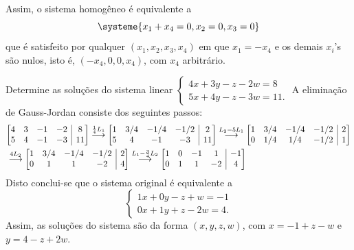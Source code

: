 \documentclass[12pt,a4paper]{article}
\makeatletter
\newenvironment{amatrix}[1]{%
  \left[\begin{array}{@{}*{#1}{c}|c@{}}
}{%
  \end{array}\right]
}
\newcommand{\grstep}[2][\relax]{%
   \ensuremath{\mathrel{
       {\mathop{\longrightarrow}\limits^{#2\mathstrut}_{
                                     \begin{subarray}{l} #1 \end{subarray}}}}}}
\makeatother
\begin{document}
\begin{ExerciseList}
\begin{enumerate}
Assim, o sistema homogêneo é equivalente a
\[
\systeme{
x_1 + x_4 = 0,
x_2 = 0,
x_3 = 0
}
\]
que é satisfeito por qualquer $(x_1, x_2, x_3, x_4)$ em que $x_1 = -x_4$ e os demais $x_i$'s são nulos, isto é, $(-x_4, 0, 0, x_4)$, com $x_4$ arbitrário.
\end{enumerate}

\Exercise[title={1,8}] Determine as soluções do sistema linear $\begin{cases}
4x + 3y - z -2 w = 8\\
5x + 4y - z -3 w = 11.
\end{cases}
$
\Answer A eliminação de Gauss-Jordan consiste dos seguintes passos:
\begin{align*}
& \begin{amatrix}{4}
4 & 3 & -1 & -2 &  8\\
5 & 4 & -1 & -3 & 11\\
\end{amatrix}
\grstep{ \frac{1}{4}L_1 }
\begin{amatrix}{4}
1 & 3/4 & -1/4 & -1/2 &  2\\
5 & 4 & -1 & -3 & 11\\
\end{amatrix}
\grstep{ L_2 -5 L_1 }
\begin{amatrix}{4}
1 & 3/4 & -1/4 & -1/2 &  2\\
0 & 1/4 & 1/4 & -1/2 & 1\\
\end{amatrix}\\
&\grstep{ 4L_2 }
\begin{amatrix}{4}
1 & 3/4 & -1/4 & -1/2 &  2\\
0 & 1 & 1 & -2 & 4\\
\end{amatrix}
\grstep{ L_1-\frac{3}{4}L_2 }
\begin{amatrix}{4}
1 & 0 & -1 & 1 & -1\\
0 & 1 & 1 & -2 & 4\\
\end{amatrix}
\end{align*}
Disto conclui-se que o sistema original é equivalente a
\[
\begin{cases}
1x + 0y - z  + w = -1\\
0x + 1y + z -2 w = 4.
\end{cases}
\]
Assim, as soluções do sistema são da forma $(x,y,z,w)$, com $x=-1+z-w$ e $y = 4-z+2w$.


\end{ExerciseList}
\end{document}
